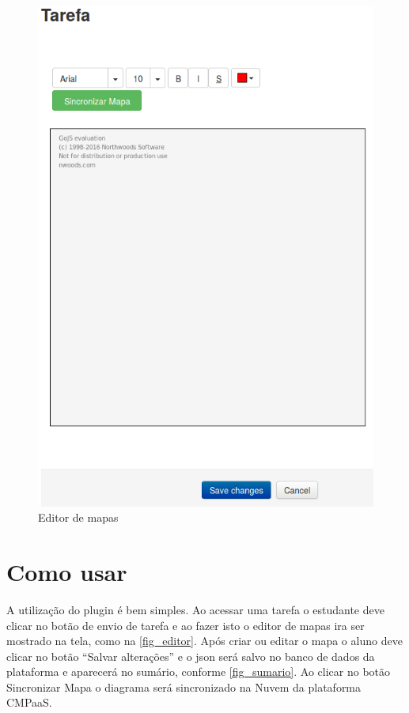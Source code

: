 \documentclass[
	12pt,				%
	openright,			%
	oneside,			%
	a4paper,			%
	english,			%
	french,				%
	spanish,			%
	brazil				%
	]{abntex2}
\begin{document}
\begin{figure}[htb]
	\caption{\label{fig_editor} Editor de mapas}
	\begin{center}
		\includegraphics[scale=0.3]{editor.png}
	\end{center}
\end{figure}

\section{Como usar}

A utilização do plugin é bem simples. Ao acessar uma tarefa o estudante deve clicar no botão de envio de tarefa e ao fazer isto o editor de mapas ira ser mostrado na tela, como na \autoref{fig_editor}. Após criar ou editar o mapa o aluno deve clicar no botão “Salvar alterações” e o json será salvo no banco de dados da plataforma e aparecerá no sumário, conforme \autoref{fig_sumario}. Ao clicar no botão Sincronizar Mapa o diagrama será sincronizado na Nuvem da plataforma CMPaaS.
\end{document}

